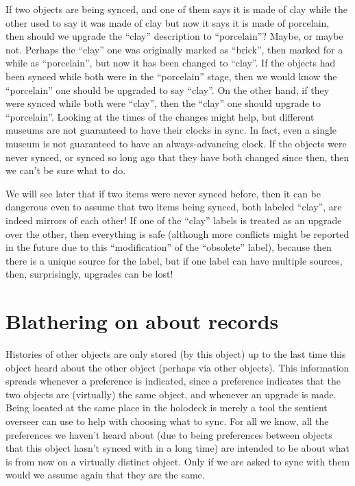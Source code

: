 \documentclass{book}
\begin{document}
If two objects are being synced, and one of them says it is made of clay while the other used to say it was made of clay but now it says it is made of porcelain, then should we upgrade the ``clay'' description to ``porcelain''?  Maybe, or maybe not.  Perhaps the ``clay'' one was originally marked as ``brick'', then marked for a while as ``porcelain'', but now it has been changed to ``clay''.  If the objects had been synced while both were in the ``porcelain'' stage, then we would know the ``porcelain'' one should be upgraded to say ``clay''.  On the other hand, if they were synced while both were ``clay'', then the ``clay'' one should upgrade to ``porcelain''.  Looking at the times of the changes might help, but different museums are not guaranteed to have their clocks in sync.  In fact, even a single museum is not guaranteed to have an always-advancing clock.  If the objects were never synced, or synced so long ago that they have both changed since then, then we can't be sure what to do.

We will see later that if two items were never synced before, then it can be dangerous even to assume that two items being synced, both labeled ``clay'', are indeed mirrors of each other!  If one of the ``clay'' labels is treated as an upgrade over the other, then everything is safe (although more conflicts might be reported in the future due to this ``modification'' of the ``obsolete'' label), because then there is a unique source for the label, but if one label can have multiple sources, then, surprisingly, upgrades can be lost!
\section{Blathering on about records}

Histories of other objects are only stored (by this object) up to the last time this object heard about the other object (perhaps via other objects).  This information spreads whenever a preference is indicated, since a preference indicates that the two objects are (virtually) the same object, and whenever an upgrade is made.  Being located at the same place in the holodeck is merely a tool the sentient overseer can use to help with choosing what to sync.  For all we know, all the preferences we haven't heard about (due to being preferences between objects that this object hasn't synced with in a long time) are intended to be about what is from now on a virtually distinct object.  Only if we are asked to sync with them would we assume again that they are the same.
\end{document}

